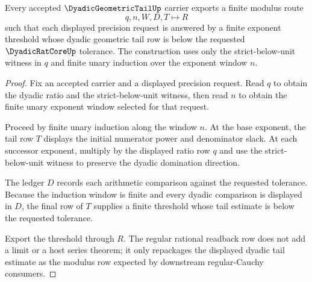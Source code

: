 \begin{theorem}
\label{thm:dyadic-geometric-tail-modulus}
Every accepted $\DyadicGeometricTailUp$ carrier exports a finite modulus route
$$
q,n,W,D,T\longmapsto R
$$
such that each displayed precision request is answered by a finite exponent threshold whose dyadic geometric tail row is below the requested $\DyadicRatCoreUp$ tolerance. The construction uses only the strict-below-unit witness in $q$ and finite unary induction over the exponent window $n$.
\end{theorem}
\begin{proof}
Fix an accepted carrier and a displayed precision request. Read $q$ to obtain the dyadic ratio and the strict-below-unit witness, then read $n$ to obtain the finite unary exponent window selected for that request.

Proceed by finite unary induction along the window $n$. At the base exponent, the tail row $T$ displays the initial numerator power and denominator slack. At each successor exponent, multiply by the displayed ratio row $q$ and use the strict-below-unit witness to preserve the dyadic domination direction.

The ledger $D$ records each arithmetic comparison against the requested tolerance. Because the induction window is finite and every dyadic comparison is displayed in $D$, the final row of $T$ supplies a finite threshold whose tail estimate is below the requested tolerance.

Export the threshold through $R$. The regular rational readback row does not add a limit or a host series theorem; it only repackages the displayed dyadic tail estimate as the modulus row expected by downstream regular-Cauchy consumers.
\end{proof}

